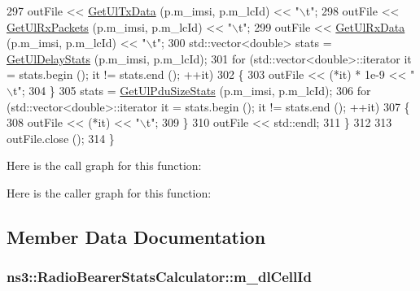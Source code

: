 \begin{DoxyCode}
297       outFile << \hyperlink{classns3_1_1RadioBearerStatsCalculator_a9445f98e5497ecfe753ef033ea13c76f}{GetUlTxData} (p.m\_imsi, p.m\_lcId) << \textcolor{stringliteral}{"\(\backslash\)t"};
298       outFile << \hyperlink{classns3_1_1RadioBearerStatsCalculator_a145c48f6328cea329657127940cb61a0}{GetUlRxPackets} (p.m\_imsi, p.m\_lcId) << \textcolor{stringliteral}{"\(\backslash\)t"};
299       outFile << \hyperlink{classns3_1_1RadioBearerStatsCalculator_a6ce5113218813509a6fb6159f9be4807}{GetUlRxData} (p.m\_imsi, p.m\_lcId) << \textcolor{stringliteral}{"\(\backslash\)t"};
300       std::vector<double> stats = \hyperlink{classns3_1_1RadioBearerStatsCalculator_ae3a37fab9714d2f08c94a0704d37d762}{GetUlDelayStats} (p.m\_imsi, p.m\_lcId);
301       \textcolor{keywordflow}{for} (std::vector<double>::iterator it = stats.begin (); it != stats.end (); ++it)
302         \{
303           outFile << (*it) * 1e-9 << \textcolor{stringliteral}{"\(\backslash\)t"};
304         \}
305       stats = \hyperlink{classns3_1_1RadioBearerStatsCalculator_a4aa7fde1ae54a5b6683cb7c12ea1d157}{GetUlPduSizeStats} (p.m\_imsi, p.m\_lcId);
306       \textcolor{keywordflow}{for} (std::vector<double>::iterator it = stats.begin (); it != stats.end (); ++it)
307         \{
308           outFile << (*it) << \textcolor{stringliteral}{"\(\backslash\)t"};
309         \}
310       outFile << std::endl;
311     \}
312 
313   outFile.close ();
314 \}
\end{DoxyCode}


Here is the call graph for this function\+:




Here is the caller graph for this function\+:




\subsection{Member Data Documentation}
\subsubsection[{\texorpdfstring{m\+\_\+dl\+Cell\+Id}{m_dlCellId}}]{ ns3\+::\+Radio\+Bearer\+Stats\+Calculator\+::m\+\_\+dl\+Cell\+Id\hspace{0.3cm}{\ttfamily [private]}}\hypertarget{classns3_1_1RadioBearerStatsCalculator_adf1e6e6d99c7fce763acea10d9fcbe7f}{}\label{classns3_1_1RadioBearerStatsCalculator_adf1e6e6d99c7fce763acea10d9fcbe7f}


